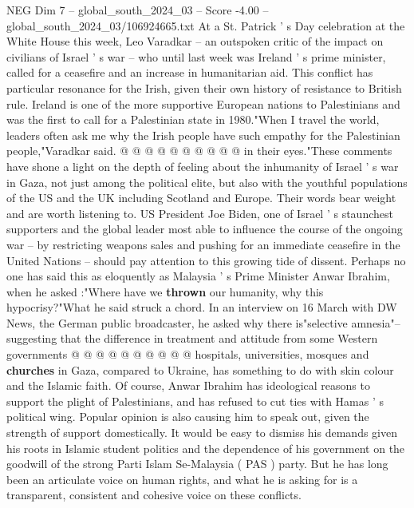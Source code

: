 \begin{textsample}{NEG Dim 7 – global\_south\_2024\_03 – Score -4.00 – global\_south\_2024\_03/106924665.txt}
At a St.
Patrick ' s Day celebration at the White House this week, Leo Varadkar -- an outspoken critic of the impact on civilians of Israel ' s war -- who until last week was Ireland ' s prime minister, called for a ceasefire and an increase in humanitarian aid.
This conflict has particular resonance for the Irish, given their own history of resistance to British rule.
Ireland is one of the more supportive European nations to Palestinians and was the first to call for a Palestinian state in 1980."When I travel the world, leaders often ask me why the Irish people have such empathy for the Palestinian people,"Varadkar said. @ @ @ @ @ @ @ @ @ @ in their eyes."These comments have shone a light on the depth of feeling about the inhumanity of Israel ' s war in Gaza, not just among the political elite, but also with the youthful populations of the US and the UK including Scotland and Europe.
Their words bear weight and are worth listening to.
US President Joe Biden, one of Israel ' s staunchest supporters and the global leader most able to influence the course of the ongoing war -- by restricting weapons sales and pushing for an immediate ceasefire in the United Nations -- should pay attention to this growing tide of dissent.
Perhaps no one has said this as eloquently as Malaysia ' s Prime Minister Anwar Ibrahim, when he asked :"Where have we \textbf{thrown} our humanity, why this hypocrisy?"What he said struck a chord.
In an interview on 16 March with DW News, the German public broadcaster, he asked why there is"selective amnesia"-- suggesting that the difference in treatment and attitude from some Western governments @ @ @ @ @ @ @ @ @ @ hospitals, universities, mosques and \textbf{churches} in Gaza, compared to Ukraine, has something to do with skin colour and the Islamic faith.
Of course, Anwar Ibrahim has ideological reasons to support the plight of Palestinians, and has refused to cut ties with Hamas ' s political wing.
Popular opinion is also causing him to speak out, given the strength of support domestically.
It would be easy to dismiss his demands given his roots in Islamic student politics and the dependence of his government on the goodwill of the strong Parti Islam Se-Malaysia ( PAS ) party.
But he has long been an articulate voice on human rights, and what he is asking for is a transparent, consistent and cohesive voice on these conflicts.

\end{textsample}

